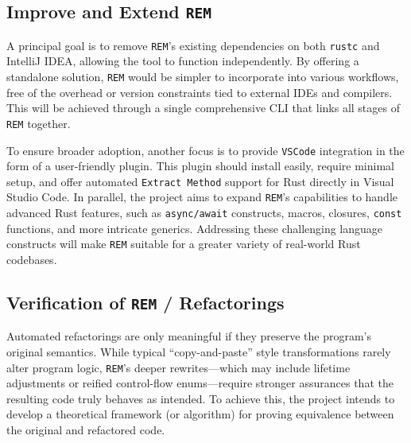 \subsection{Improve and Extend \texttt{REM}}
\label{sec:improve-extend-rem}

A principal goal is to remove \texttt{REM}'s existing dependencies on both
\texttt{rustc} and IntelliJ IDEA, allowing the tool to function independently.
By offering a standalone solution, \texttt{REM} would be simpler to incorporate
into various workflows, free of the overhead or version constraints tied to
external IDEs and compilers. This will be achieved through a single
comprehensive CLI that links all stages of \texttt{REM} together.

To ensure broader adoption, another focus is to provide \texttt{VSCode}
integration in the form of a user-friendly plugin. This plugin should install
easily, require minimal setup, and offer automated \texttt{Extract Method}
support for Rust directly in Visual Studio Code. In parallel, the project aims
to expand \texttt{REM}'s capabilities to handle advanced Rust features, such as
\texttt{async/await} constructs, macros, closures, \texttt{const} functions, and
more intricate generics. Addressing these challenging language constructs will
make \texttt{REM} suitable for a greater variety of real-world Rust codebases.

\subsection{Verification of \texttt{REM} / Refactorings}
\label{sec:verification-rem}

Automated refactorings are only meaningful if they preserve the program's
original semantics. While typical “copy-and-paste” style transformations rarely
alter program logic, \texttt{REM}'s deeper rewrites---which may include lifetime
adjustments or reified control-flow enums---require stronger assurances that the
resulting code truly behaves as intended. To achieve this, the project intends
to develop a theoretical framework (or algorithm) for proving equivalence
between the original and refactored code.

